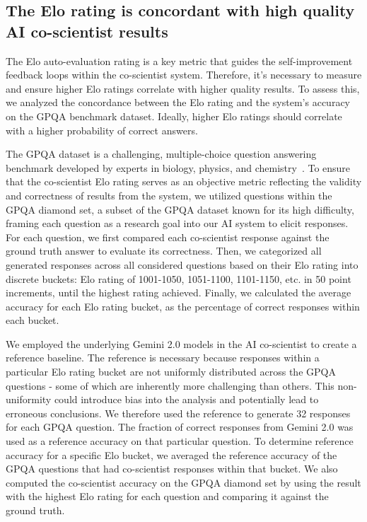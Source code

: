 \subsection{The Elo rating is concordant with high quality AI co-scientist results}
\label{sec:result_quality}

The Elo auto-evaluation rating is a key metric that guides the self-improvement feedback loops within the co-scientist system. Therefore, it's necessary to measure and ensure higher Elo ratings correlate with higher quality results. To assess this, we analyzed the concordance between the Elo rating and the system's accuracy on the GPQA benchmark dataset. Ideally, higher Elo ratings should correlate with a higher probability of correct answers.

The GPQA dataset is a challenging, multiple-choice question answering benchmark developed by experts in biology, physics, and chemistry~\citep{rein2023gpqa}. To ensure that the co-scientist Elo rating serves as an objective metric reflecting the validity and correctness of results from the system, we utilized questions within the GPQA diamond set, a subset of the GPQA dataset known for its high difficulty, framing each question as a research goal into our AI system to elicit responses. For each question, we first compared each co-scientist response against the ground truth answer to evaluate its correctness. Then, we categorized all generated responses across all considered questions based on their Elo rating into discrete buckets: Elo rating of 1001-1050, 1051-1100, 1101-1150, etc. in 50 point increments, until the highest rating achieved. Finally, we calculated the average accuracy for each Elo rating bucket, as the percentage of correct responses within each bucket.

We employed the underlying Gemini 2.0 models in the AI co-scientist to create a reference baseline. The reference is necessary because responses within a particular Elo rating bucket are not uniformly distributed across the GPQA questions - some of which are inherently more challenging than others. This non-uniformity could introduce bias into the analysis and potentially lead to erroneous conclusions. We therefore used the reference to generate 32 responses for each GPQA question. The fraction of correct responses from Gemini 2.0 was used as a reference accuracy on that particular question. To determine reference accuracy for a specific Elo bucket, we averaged the reference accuracy of the GPQA questions that had co-scientist responses within that bucket. We also computed the co-scientist accuracy on the GPQA diamond set by using the result with the highest Elo rating for each question and comparing it against the ground truth.

